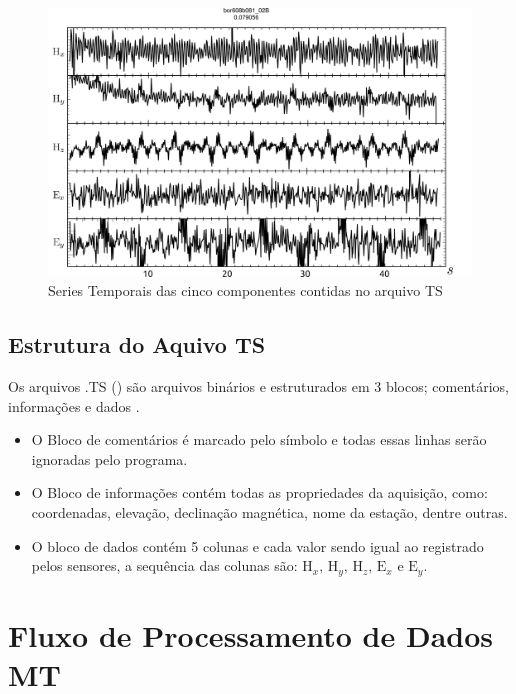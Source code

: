         \begin{figure}[H]
            \centering
	        \caption{Series Temporais das cinco componentes contidas no arquivo TS}
	        \begin{center}
	        \includegraphics[width=13cm]{texto/fig/campos_divididos.png} 
	        \end{center}
	    \end{figure}
        
        \subsection{Estrutura do Aquivo TS}
            \label{subsec-arquivoTS}    
            Os arquivos .TS () são arquivos binários e estruturados em 3 blocos; comentários, informações e dados  \cite{tsformat}.
            \begin{itemize}
             \item O Bloco de comentários é marcado pelo símbolo \en{\#} e todas essas linhas serão ignoradas pelo programa.
             \item   O Bloco de informações contém todas as propriedades da aquisição, como: coordenadas, elevação, declinação magnética, nome da estação, dentre outras.
             \item O bloco de dados contém 5 colunas e cada valor sendo igual ao registrado pelos sensores, a sequência das colunas são: $\textrm{H}_x,\, \textrm{H}_y, \, \textrm{H}_z, \, \textrm{E}_x \, \, \textrm{e} \, \, \textrm{E}_y$.
            \end{itemize}

    
    \section{Fluxo de Processamento de Dados MT}
       
